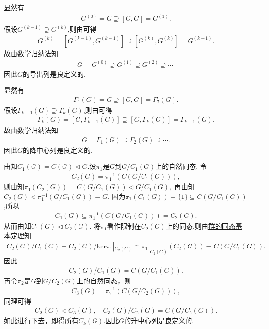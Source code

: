 \documentclass[../../main.tex]{subfiles}%
\begin{document}
\begin{remark}
显然有
\begin{align*}
G^{(0)} = G \supseteq [G, G] = G^{(1)}.
\end{align*}
假设$G^{(k-1)} \supseteq G^{(k)}$,则由可得
\begin{align*}
G^{(k)} = [G^{(k-1)}, G^{(k-1)}] \supseteq [G^{(k)}, G^{(k)}] = G^{(k+1)}.
\end{align*}
故由数学归纳法知
\begin{align*}
G = G^{(0)} \supseteq G^{(1)} \supseteq G^{(2)} \supseteq \cdots.
\end{align*}
因此$G$的导出列是良定义的.

显然有
\begin{align*}
\Gamma_1(G) = G \supseteq [G, G] = \Gamma_2(G).
\end{align*}
假设$\Gamma_{k-1}(G) \supseteq \Gamma_k(G)$,则由可得
\begin{align*}
\Gamma_k(G) = [G, \Gamma_{k-1}(G)] \supseteq [G, \Gamma_k(G)] = \Gamma_{k+1}(G).
\end{align*}
故由数学归纳法知
\begin{align*}
G = \Gamma_1(G) \supseteq \Gamma_2(G) \supseteq \cdots.
\end{align*}
因此$G$的降中心列是良定义的.

由知$C_1(G) = C(G)\lhd G$.设$\pi_1$是$G$到$G/C_1(G)$上的自然同态. 令
\begin{align*}
C_2(G) = \pi_1^{-1}(C(G/C_1(G))),
\end{align*}
则由知$\pi _1\left( C_2\left( G \right) \right) =C\left( G/C_1\left( G \right) \right) \lhd G/C_1\left( G \right),$
再由知$C_2(G)\lhd \pi _{1}^{-1}\left( G/C_1\left( G \right) \right) =G$.
因为$\pi_1(C_1(G)) = \{1\} \subseteq C(G/C_1(G))$,所以
\begin{align*}
C_1(G) \subseteq \pi_1^{-1}(C(G/C_1(G))) = C_2(G).
\end{align*}
从而由知$C_1(G)\lhd C_2(G)$.
将$\pi_1$看作限制在$C_2(G)$上的同态,则由\hyperref[theorem:群的同态基本定理]{群的同态基本定理}知
\begin{align*}
C_2(G)/C_1(G) = C_2(G)/\mathrm{ker}\pi_1|_{C_2(G)} \cong \pi_1|_{C_2(G)}(C_2(G)) = C(G/C_1(G)).
\end{align*}
因此
\begin{align*}
C_2(G)/C_1(G) = C(G/C_1(G)).
\end{align*}
再令$\pi_2$是$G$到$G/C_2(G)$上的自然同态，则
\begin{align*}
C_3(G) = \pi_2^{-1}(C(G/C_2(G))),
\end{align*}
同理可得
\begin{align*}
C_2(G)\lhd C_3(G),\quad C_3(G)/C_2(G) = C(G/C_2(G)).
\end{align*}
如此进行下去，即得所有$C_k(G)$.因此$G$的升中心列是良定义的.
\end{remark}
\end{document}
